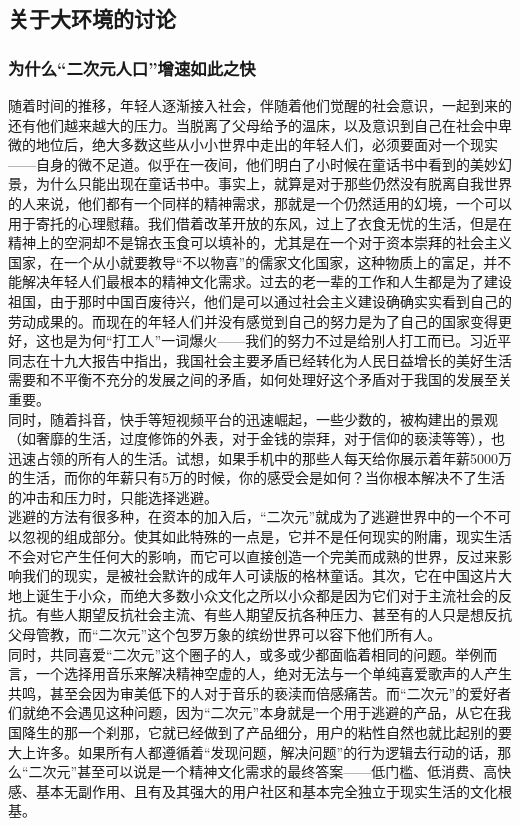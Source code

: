 \documentclass[a4paper]{article}
\begin{document}
	\subsection{关于大环境的讨论}
	\subsubsection{为什么“二次元人口”增速如此之快}
	随着时间的推移，年轻人逐渐接入社会，伴随着他们觉醒的社会意识，一起到来的还有他们越来越大的压力。当脱离了父母给予的温床，以及意识到自己在社会中卑微的地位后，绝大多数这些从小小世界中走出的年轻人们，必须要面对一个现实——自身的微不足道。似乎在一夜间，他们明白了小时候在童话书中看到的美妙幻景，为什么只能出现在童话书中。事实上，就算是对于那些仍然没有脱离自我世界的人来说，他们都有一个同样的精神需求，那就是一个仍然适用的幻境，一个可以用于寄托的心理慰藉。我们借着改革开放的东风，过上了衣食无忧的生活，但是在精神上的空洞却不是锦衣玉食可以填补的，尤其是在一个对于资本崇拜的社会主义国家，在一个从小就要教导“不以物喜”的儒家文化国家，这种物质上的富足，并不能解决年轻人们最根本的精神文化需求。过去的老一辈的工作和人生都是为了建设祖国，由于那时中国百废待兴，他们是可以通过社会主义建设确确实实看到自己的劳动成果的。而现在的年轻人们并没有感觉到自己的努力是为了自己的国家变得更好，这也是为何“打工人”一词爆火——我们的努力不过是给别人打工而已。习近平同志在十九大报告中指出，我国社会主要矛盾已经转化为人民日益增长的美好生活需要和不平衡不充分的发展之间的矛盾，如何处理好这个矛盾对于我国的发展至关重要。\\
	
	同时，随着抖音，快手等短视频平台的迅速崛起，一些少数的，被构建出的景观（如奢靡的生活，过度修饰的外表，对于金钱的崇拜，对于信仰的亵渎等等），也迅速占领的所有人的生活。试想，如果手机中的那些人每天给你展示着年薪5000万的生活，而你的年薪只有5万的时候，你的感受会是如何？当你根本解决不了生活的冲击和压力时，只能选择逃避。\\
	
	逃避的方法有很多种，在资本的加入后，“二次元”就成为了逃避世界中的一个不可以忽视的组成部分。使其如此特殊的一点是，它并不是任何现实的附庸，现实生活不会对它产生任何大的影响，而它可以直接创造一个完美而成熟的世界，反过来影响我们的现实，是被社会默许的成年人可读版的格林童话。其次，它在中国这片大地上诞生于小众，而绝大多数小众文化之所以小众都是因为它们对于主流社会的反抗。有些人期望反抗社会主流、有些人期望反抗各种压力、甚至有的人只是想反抗父母管教，而“二次元”这个包罗万象的缤纷世界可以容下他们所有人。\\
	
	同时，共同喜爱“二次元”这个圈子的人，或多或少都面临着相同的问题。举例而言，一个选择用音乐来解决精神空虚的人，绝对无法与一个单纯喜爱歌声的人产生共鸣，甚至会因为审美低下的人对于音乐的亵渎而倍感痛苦。而“二次元”的爱好者们就绝不会遇见这种问题，因为“二次元”本身就是一个用于逃避的产品，从它在我国降生的那一个刹那，它就已经做到了产品细分，用户的粘性自然也就比起别的要大上许多。如果所有人都遵循着“发现问题，解决问题”的行为逻辑去行动的话，那么“二次元”甚至可以说是一个精神文化需求的最终答案——低门槛、低消费、高快感、基本无副作用、且有及其强大的用户社区和基本完全独立于现实生活的文化根基。
\end{document}
